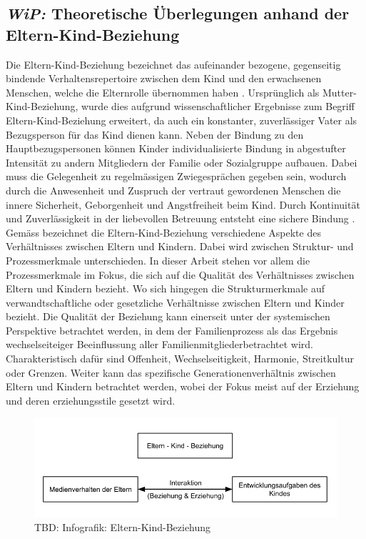 \subsection{\textit{WiP:} Theoretische Überlegungen anhand der Eltern-Kind-Beziehung}\label{sec:TheretischeÜberlegungen}
Die Eltern-Kind-Beziehung bezeichnet das aufeinander bezogene, gegenseitig bindende Verhaltensrepertoire zwischen dem Kind und den erwachsenen Menschen, welche die Elternrolle übernommen haben \cite{ElternKindBeziehung1999}. Ursprünglich als Mutter-Kind-Beziehung, wurde dies aufgrund wissenschaftlicher Ergebnisse zum Begriff Eltern-Kind-Beziehung erweitert, da auch ein konstanter, zuverlässiger Vater als Bezugsperson für das Kind dienen kann. Neben der Bindung zu den Hauptbezugspersonen können Kinder individualisierte Bindung in abgestufter Intensität zu andern Mitgliedern der Familie oder Sozialgruppe aufbauen. Dabei muss die Gelegenheit zu regelmässigen Zwiegesprächen gegeben sein, wodurch durch die Anwesenheit und Zuspruch der vertraut gewordenen Menschen die innere Sicherheit, Geborgenheit und Angstfreiheit beim Kind. Durch Kontinuität und Zuverlässigkeit in der liebevollen Betreuung entsteht eine sichere Bindung \cite{ElternKindBeziehung1999}. Gemäss  bezeichnet die Eltern-Kind-Beziehung verschiedene Aspekte des Verhältnisses zwischen Eltern und Kindern. Dabei wird zwischen Struktur- und Prozessmerkmale unterschieden. In dieser Arbeit stehen vor allem die Prozessmerkmale im Fokus, die sich auf die Qualität des Verhältnisses zwischen Eltern und Kindern bezieht. Wo sich hingegen die Strukturmerkmale auf verwandtschaftliche oder gesetzliche Verhältnisse zwischen Eltern und Kinder bezieht. Die Qualität der Beziehung kann einerseit unter der systemischen Perspektive betrachtet werden, in dem der Familienprozess als das Ergebnis wechselseiteiger Beeinflussung aller Familienmitgliederbetrachtet wird. Charakteristisch dafür sind Offenheit, Wechselseitigkeit, Harmonie, Streitkultur oder Grenzen. Weiter kann das spezifische Generationenverhältnis zwischen Eltern und Kindern betrachtet werden, wobei der Fokus meist auf der Erziehung und deren erziehungsstile gesetzt wird. 
\begin{figure}%
  \centering
     \includegraphics[width=1.0\textwidth]{content/Grafik/Infografik_ElternKindBeziehung.png}
  \caption{TBD: Infografik: Eltern-Kind-Beziehung}
  \label{fig:InfografikElternKindBeziehung}
\end{figure}

